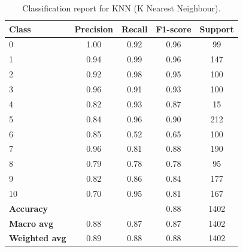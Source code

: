 \begin{table}[h]
    \centering
    \begin{tabular}{lcccc}
        \toprule
        \textbf{Class} & \textbf{Precision} & \textbf{Recall} & \textbf{F1-score} & \textbf{Support} \\
        \midrule
        0 & 1.00 & 0.92 & 0.96 & 99 \\
        1 & 0.94 & 0.99 & 0.96 & 147 \\
        2 & 0.92 & 0.98 & 0.95 & 100 \\
        3 & 0.96 & 0.91 & 0.93 & 100 \\
        4 & 0.82 & 0.93 & 0.87 & 15 \\
        5 & 0.84 & 0.96 & 0.90 & 212 \\
        6 & 0.85 & 0.52 & 0.65 & 100 \\
        7 & 0.96 & 0.81 & 0.88 & 190 \\
        8 & 0.79 & 0.78 & 0.78 & 95 \\
        9 & 0.82 & 0.86 & 0.84 & 177 \\
        10 & 0.70 & 0.95 & 0.81 & 167 \\
        \midrule
        \textbf{Accuracy} & & & 0.88 & 1402 \\
        \textbf{Macro avg} & 0.88 & 0.87 & 0.87 & 1402 \\
        \textbf{Weighted avg} & 0.89 & 0.88 & 0.88 & 1402 \\
        \bottomrule
    \end{tabular}
    \caption{Classification report for KNN (K Nearest Neighbour).}
    \label{tab:classification_report_knn}
\end{table}



\FloatBarrier
